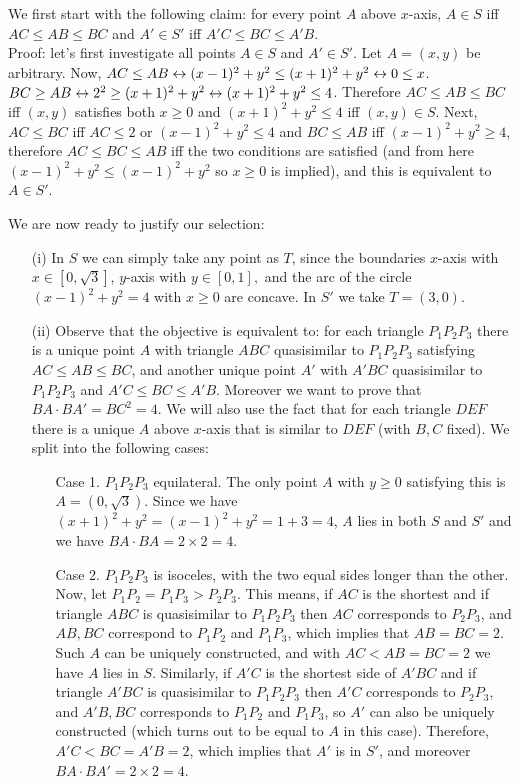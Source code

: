 \documentclass[11pt,a4paper]{article}
\begin{document}
\begin{itemize}
We first start with the following claim: 
for every point $A$ above $x$-axis, $A\in S$ iff $AC\le AB\le BC$ and $A'\in S'$ iff $A'C\le BC\le A'B$. \\
Proof: let's first investigate all points $A\in S$ and $A'\in S'$. 
Let $A=(x,y)$ be arbitrary. 
Now, $AC\le AB\leftrightarrow(x-1)^2+y^2\le  (x+1)^2+y^2\leftrightarrow 0\le x$. 
$BC\ge AB\leftrightarrow 2^2\ge (x+1)^2+y^2\leftrightarrow (x+1)^2+y^2\le 4$. 
Therefore $AC\le AB\le BC$ iff $(x,y)$ satisfies both $x\ge 0$ and $(x+1)^2+y^2\le 4$ iff $(x,y)\in S$. 
Next, $AC\le BC$ iff 
$AC\le 2$ or $(x-1)^2+y^2\le 4$ 
and $BC\le AB$ iff
$(x-1)^2+y^2\ge 4$, 
therefore $AC\le BC\le AB$ iff the two conditions are satisfied (and from here $(x-1)^2+y^2\le (x-1)^2+y^2$ so $x\ge 0$ is implied), 
and this is equivalent to $A\in S'$. 

We are now ready to justify our selection: 
\begin{itemize}
\item[(i)]
In $S$ we can simply take any point as $T$, since the boundaries $x$-axis with $x\in [0, \sqrt{3}]$, $y$-axis with $y\in [0, 1], $ and the arc of the circle $(x-1)^2+y^2=4$ with $x\ge 0$ are concave. 
In $S'$ we take $T=(3,0)$. 

\item[(ii)] Observe that the objective is equivalent to: 
for each triangle $P_1P_2P_3$ there is a unique point $A$ with triangle $ABC$ quasisimilar to $P_1P_2P_3$ satisfying $AC\le AB\le BC$, 
and another unique point $A'$ with $A'BC$ quasisimilar to $P_1P_2P_3$ and $A'C\le BC\le A'B$. 
Moreover we want to prove that $BA\cdot BA'=BC^2=4$. 
We will also use the fact that for each triangle $DEF$ there is a unique $A$ above $x$-axis that is similar to $DEF$ (with $B, C$ fixed). 
We split into the following cases: 
\begin{itemize}
\item [Case 1.] $P_1P_2P_3$ equilateral. The only point $A$ with $y\ge 0$ satisfying this is 
$A=(0, \sqrt{3})$. 
Since we have $(x+1)^2+y^2=(x-1)^2+y^2=1+3=4$, $A$ lies in both $S$ and $S'$ and we have $BA\cdot BA=2\times 2=4$. 
\item [Case 2.] $P_1P_2P_3$ is isoceles, with the two equal sides longer than the other. 
Now, let $P_1P_2=P_1P_3>P_2P_3$. 
This means, if $AC$ is the shortest and if triangle $ABC$ is quasisimilar to $P_1P_2P_3$ then $AC$ corresponds to $P_2P_3$, 
and $AB, BC$ correspond to $P_1P_2$ and $P_1P_3$, which implies that 
$AB=BC=2$. 
Such $A$ can be uniquely constructed, and with $AC < AB=BC=2$ we have $A$ lies in $S$. 
Similarly, if $A'C$ is the shortest side of $A'BC$ and if triangle $A'BC$ is quasisimilar to $P_1P_2P_3$ then $A'C$ corresponds to $P_2P_3$, and $A'B, BC$ corresponds to $P_1P_2$ and $P_1P_3$, so 
$A'$ can also be uniquely constructed (which turns out to be equal to $A$ in this case). 
Therefore, $A'C < BC=A'B=2$, which implies that $A'$ is in $S'$, and moreover $BA\cdot BA'=2\times 2=4$. 


\end{itemize}
\end{itemize}
\end{itemize}
\end{document}
